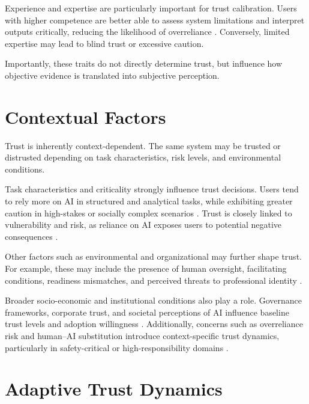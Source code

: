 \documentclass[sigconf]{acmart}
\begin{document}
Experience and expertise are particularly important for trust calibration. Users with higher competence are better able to assess system limitations and interpret outputs critically, reducing the likelihood of overreliance \cite{Wang_yin_2021, Aldoseri_et_al_2023}. Conversely, limited expertise may lead to blind trust or excessive caution.

Importantly, these traits do not directly determine trust, but influence how objective evidence is translated into subjective perception.

\section{Contextual Factors}

Trust is inherently context-dependent. The same system may be trusted or distrusted depending on task characteristics, risk levels, and environmental conditions.

Task characteristics and criticality strongly influence trust decisions. Users tend to rely more on AI in structured and analytical tasks, while exhibiting greater caution in high-stakes or socially complex scenarios \cite{glickson_2020_review_of_empirical_research, choudhury_asan_2020_trust_clinicians}. Trust is closely linked to vulnerability and risk, as reliance on AI exposes users to potential negative consequences \cite{jacovi_2021_formalizing_trust_ai, de_visser_longitudinal_trust}.

Other factors such as environmental and organizational may further shape trust. For example, these may include the presence of human oversight, facilitating conditions, readiness mismatches, and perceived threats to professional identity \cite{young_patient_systematic_review, chi_formative_scale, bach_systematic_literature_review}. 

Broader socio-economic and institutional conditions also play a role. Governance frameworks, corporate trust, and societal perceptions of AI influence baseline trust levels and adoption willingness \cite{wang_2019_artificial_intelligence_future_humanity, schepman_general_attitude}. Additionally, concerns such as overreliance risk and human–AI substitution introduce context-specific trust dynamics, particularly in safety-critical or high-responsibility domains \cite{choudhury_chat_gpt, aoki_chatbot_experimental}.

\section{Adaptive Trust Dynamics}
\end{document}
